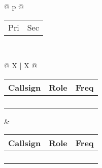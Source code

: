 \begin{adjustbox}{width={\textwidth},totalheight={\textheight},keepaspectratio}
{\begin{tabularx}{\textwidth}{ @{} p{\linewidth} @{} }
	\\[-3ex] \midrule
	{\begin{tabularx}{\textwidth}{@{} *{2}X @{}}
		Pri & Sec\\[-3ex]
	\end{tabularx}}\\ \midrule
	{\begin{tabularx}{\textwidth}{@{} X | X @{}}
		{\begin{tabularx}{\linewidth}{@{} *{3}X @{}}
			Callsign & Role & Freq\\[-3ex] \midrule
			\hfill & \hfill & \hfill\\ \midrule
			\hfill & \hfill & \hfill\\ \midrule
			\hfill & \hfill & \hfill\\ \midrule
			\hfill & \hfill & \hfill\\
		\end{tabularx}} &
		{\begin{tabularx}{\linewidth}{@{} *{3}X @{}}
			Callsign & Role & Freq\\[-3ex] \midrule	
			\hfill & \hfill & \hfill\\ \midrule
			\hfill & \hfill & \hfill\\ \midrule
			\hfill & \hfill & \hfill\\ \midrule
			\hfill & \hfill & \hfill\\
		\end{tabularx}}\\
	\end{tabularx}}\\ \midrule
	

\end{tabularx}}
\end{adjustbox}
